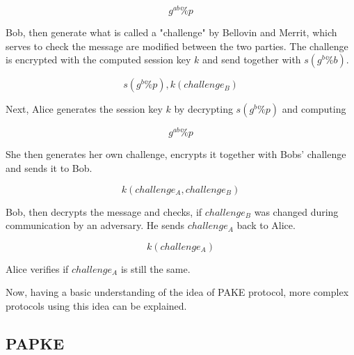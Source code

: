 \documentclass[../main.tex]{subfiles}
\begin{document}
\[g^{ab} \% p\]

Bob, then generate what is called a "challenge" by Bellovin and Merrit, which serves
to check the message are modified between the two parties. The challenge is encrypted
with the computed session key \(k\) and send together with \(s(g^b \% b)\).

\[s(g^b \% p), k(challenge_B)\]

Next, Alice generates the session key \(k\) by decrypting \(s(g^b \% p)\) and computing

\[g^{ab} \% p\]

She then generates her own challenge, encrypts it together with Bobs' challenge
and sends it to Bob. 

\[k(challenge_A, challenge_B)\]

Bob, then decrypts the message and checks, if \(challenge_B\) was changed during
communication by an adversary. He sends \(challenge_A\) back to Alice.

\[k(challenge_A)\]

Alice verifies if \(challenge_A\) is still the same.

Now, having a basic understanding of  the idea of PAKE protocol, more complex protocols
using this idea can be explained.

\subsection{PAPKE}
\end{document}
